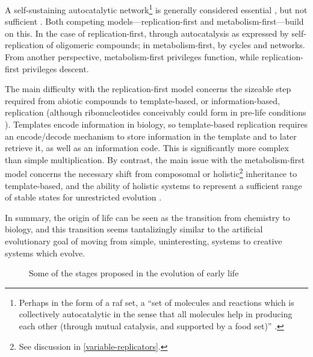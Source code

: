 A self-sustaining autocatalytic network\footnote{Perhaps in the form of a \gls{raf} set, a ``set of molecules and reactions which is collectively autocatalytic in the sense that all molecules help in producing each other (through mutual catalysis, and supported by a food set)'' \parencite{Hordijk2011}.} is generally considered essential \parencite{Pross2013}, but not sufficient \parencite{Hordijk2011}. Both competing models---replication-first and metabolism-first---build on this. In the case of replication-first, through autocatalysis as expressed by self-replication of oligomeric compounds; in metabolism-first, by cycles and networks. From another perspective, metabolism-first privileges function, while replication-first privileges descent.

The main difficulty with the replication-first model concerns the sizeable step required from abiotic compounds to template-based, or information-based, replication (although ribonucleotides conceivably could form in pre-life conditions \parencite{Powner2009}). Templates encode information in biology, so template-based replication requires an encode/decode mechanism to store information in the template and to later retrieve it, as well as an information code. This is significantly more complex than simple multiplication. By contrast, the main issue with the metabolism-first model concerns the necessary shift from composomal or holistic\footnote{See discussion in \cref{variable-replicators}.} inheritance to template-based, and the ability of holistic systems to represent a sufficient range of stable states for unrestricted evolution \parencite{Vasas2010}.

In summary, the origin of life can be seen as the transition from chemistry to biology, and this transition seems tantalizingly similar to the artificial evolutionary goal of moving from simple, uninteresting, systems to creative systems which evolve. 

\begin{figure}
	\begin{center}
	\end{center}
	\caption{Some of the stages proposed in the evolution of early life}
	\label{major-stages-early-life}
\end{figure}

